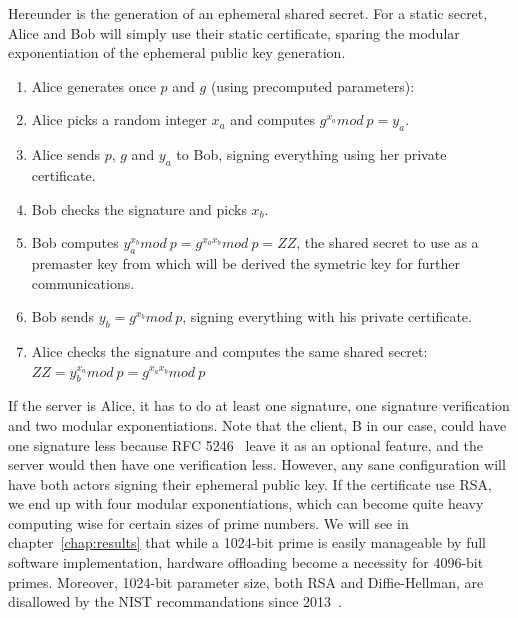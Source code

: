 Hereunder is the generation of an ephemeral shared secret.
For a static secret, Alice and Bob will simply use their static certificate, sparing the modular exponentiation of the ephemeral public key generation.
\begin{enumerate}
	\item Alice generates once $p$ and $g$ (using precomputed parameters):
	\begin{description}[nosep]
		\item[p] large prime number
		\item[g] a generator of $\mathds{Z}_p^*$
	\end{description}
	\item Alice picks a random integer $x_a$ and computes $g^{x_a} mod\ p = y_a$.
	\item Alice sends $p$, $g$ and $y_a$ to Bob, signing everything using her private certificate.
	\item Bob checks the signature and picks $x_b$.
	\item Bob computes $y_a^{x_b} mod\ p = g^{x_a x_b} mod\ p = ZZ$, the shared secret to use as a premaster key from which will be derived the symetric key for further communications.
	\item Bob sends $y_b = g^{x_b} mod\ p$, signing everything with his private certificate.
	\item Alice checks the signature and computes the same shared secret: $ZZ = y_b^{x_a} mod\ p = g^{x_a x_b} mod\ p$
\end{enumerate}

If the server is Alice, it has to do at least one signature, one signature verification and two modular exponentiations.
Note that the client, B in our case, could have one signature less because RFC 5246~\cite{rfc5246} leave it as an optional feature, and the server would then have one verification less.
However, any sane configuration will have both actors signing their ephemeral public key.
If the certificate use RSA, we end up with four modular exponentiations, which can become quite heavy computing wise for certain sizes of prime numbers.
We will see in chapter~\ref{chap:results} that while a 1024-bit prime is easily manageable by full software implementation, hardware offloading become a necessity for 4096-bit primes.
Moreover, 1024-bit parameter size, both RSA and Diffie-Hellman, are disallowed by the NIST recommandations since 2013~\cite{nist-sp800-131A}.












